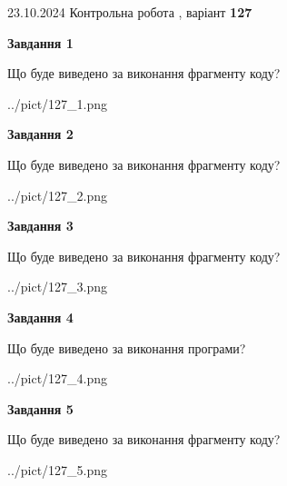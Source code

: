 \documentclass[12pt, ukrainian]{article}
\begin{document}
{\Large{23.10.2024 Контрольна робота , варіант  \No \textbf { 127 }\par}}
{
\begin {large}
{\begin {center}\textbf{Завдання 1}\end {center}}

Що буде виведено за виконання фрагменту коду?\par
\begin{center}
	{../pict/127_1.png}
\end{center}
\newpage

{\begin {center}\textbf{Завдання 2}\end {center}}

Що буде виведено за виконання фрагменту коду?\par
\begin{center}
	{../pict/127_2.png}
\end{center}
\newpage

{\begin {center}\textbf{Завдання 3}\end {center}}

Що буде виведено за виконання фрагменту коду?\par
\begin{center}
	{../pict/127_3.png}
\end{center}
\newpage

{\begin {center}\textbf{Завдання 4}\end {center}}

Що буде виведено за виконання програми?\par
\begin{center}
	{../pict/127_4.png}
\end{center}
\newpage

{\begin {center}\textbf{Завдання 5}\end {center}}

Що буде виведено за виконання фрагменту коду?\par
\begin{center}
	{../pict/127_5.png}
\end{center}
\newpage


\end{large}}
\end{document}
